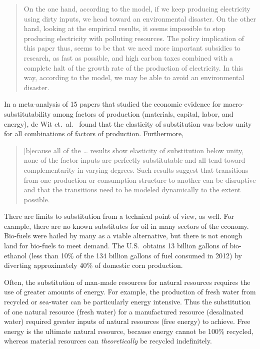 \begin{quote}
	On the one hand, according to the model, 
	if we keep producing electricity using dirty inputs, 
	we head toward an environmental disaster. 
	On the other hand, looking at the empirical results, 
	it seems impossible to stop producing electricity with polluting resources. 
	The policy implication of this paper thus, 
	seems to be that we need more important subsidies to research, 
	as fast as possible, 
	and high carbon taxes combined with a complete halt 
	of the growth rate of the production of electricity. 
	In this way, according to the model, 
	we may be able to avoid an environmental disaster.\cite[p.~25]{Pelli:2012wv}
\end{quote}

In a meta-analysis of 15 papers that studied 
the economic evidence for macro-substitutability
among factors of production (materials, capital, labor, and energy), 
de Wit et.\ al.\ \cite{de-Wit:2013aa} found that the elasticity of substitution was 
below unity for all combinations of factors of production.
Furthermore, 

\begin{quote}
	[b]ecause all of the \dots{} results show elasticity of substitution below unity, 
	none of the factor inputs are perfectly substitutable and 
	all tend toward complementarity in varying degrees. 
	Such results suggest that transitions 
	from one production or consumption structure to another 
	can be disruptive and that the transitions 
	need to be modeled dynamically to the extent possible.\cite[p.~8]{de-Wit:2013aa}
\end{quote}

There are limits to substitution from a technical point of view, as well.
For example, there are no known substitutes for oil 
in many sectors of the economy.\cite{Hirsch2005}
Bio-fuels were hailed by many as a viable alternative,
but there is not enough land for bio-fuels to meet demand.
The U.S.\ obtains 13 billion gallons of bio-ethanol 
(less than 10\% of the 134 billion gallons of fuel consumed in 2012)
by diverting approximately 40\%
of domestic corn production.\cite{EIA2014, USDA2014}

Often, the substitution of man-made resources for natural resources
requires the use of greater amounts of energy.
For example, the production of fresh water from recycled or sea-water
can be particularly energy intensive.
Thus the substitution of one natural resource (fresh water)
for a manufactured resource (desalinated water)
required greater inputs of natural resources (free energy) to achieve.
Free energy is the ultimate natural resource, because energy cannot be 100\% recycled,
whereas material resources can \emph{theoretically} be recycled indefinitely.


